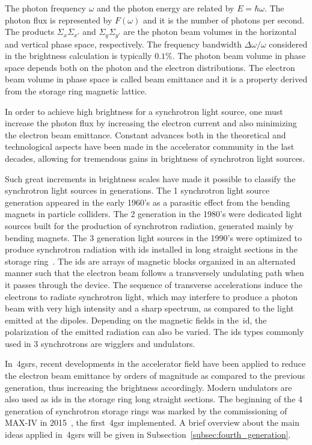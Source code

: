 The photon frequency $\omega$ and the photon energy are related by $E = \hbar \omega$. The photon flux is represented by $F(\omega)$ and it is the number of photons per second. The products $\Sigma_x \Sigma_{x'}$ and $\Sigma_y\Sigma_{y'}$ are the photon beam volumes in the horizontal and vertical phase space, respectively. The frequency bandwidth $\Delta \omega/\omega$ considered in the brightness calculation is typically $0.1\%$. The photon beam volume in phase space depends both on the photon and the electron distributions. The electron beam volume in phase space is called beam emittance and it is a property derived from the storage ring magnetic lattice.

In order to achieve high brightness for a synchrotron light source, one must increase the photon flux by increasing the electron current and also minimizing the electron beam emittance. Constant advances both in the theoretical and technological aspects have been made in the accelerator community in the last decades, allowing for tremendous gains in brightness of synchrotron light sources\cite{eriksson, liu2017}. 

Such great increments in brightness scales have made it possible to classify the synchrotron light sources in generations. The 1 synchrotron light source generation appeared in the early 1960's as a parasitic effect from the bending magnets in particle colliders. The 2 generation in the 1980's were dedicated light sources built for the production of synchrotron radiation, generated mainly by bending magnets. The 3 generation light sources in the 1990's were optimized to produce synchrotron radiation with \glspl{id} installed in long straight sections in the storage ring~\cite{liu2017}. The \glspl{id} are arrays of magnetic blocks organized in an alternated manner such that the electron beam follows a transversely undulating path when it passes through the device. The sequence of transverse accelerations induce the electrons to radiate synchrotron light, which may interfere to produce a photon beam with very high intensity and a sharp spectrum, as compared to the light emitted at the dipoles. Depending on the magnetic fields in the~\gls{id}, the polarization of the emitted radiation can also be varied. The \glspl{id} types commonly used in 3 synchrotrons are wigglers and undulators.

In~\glspl{4gsr}, recent developments in the accelerator field have been applied to reduce the electron beam emittance by orders of magnitude as compared to the previous generation, thus increasing the brightness accordingly. Modern undulators are also used as \glspl{id} in the storage ring long straight sections. The beginning of the 4 generation of synchrotron storage rings was marked by the commissioning of MAX-IV in 2015~\cite{eriksson2016}, the first~\gls{4gsr} implemented. A brief overview about the main ideas applied in~\glspl{4gsr} will be given in Subsection~\ref{subsec:fourth_generation}.
